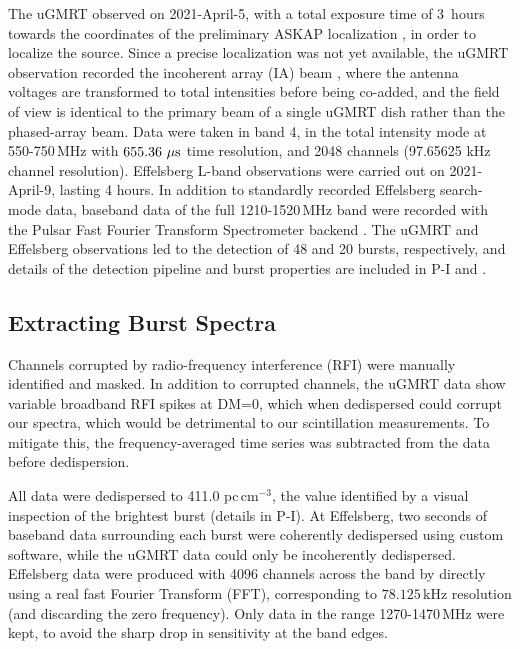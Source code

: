\documentclass[fleqn,usenatbib]{mnras}
\newcommand{\dmu}{pc\,cm$^{-3}$}
\begin{document}
The uGMRT observed on 2021-April-5, with a total exposure time of 3~hours towards the coordinates of the preliminary ASKAP localization \citep{askapAtelCoarse}, in order to localize the source.  Since a precise localization was not yet available, the uGMRT observation recorded the incoherent array (IA) beam \citep{uGMRTpaper}, where the antenna voltages are transformed to total intensities before being co-added, and the field of view is identical to the primary beam of a single uGMRT dish rather than the phased-array beam.
 Data were taken in band 4, in the total intensity mode at 550-750\,MHz with $655.36~{\rm \mu s}$ time resolution, and 2048 channels (97.65625 kHz channel resolution).  Effelsberg L-band observations were carried out on 2021-April-9, lasting 4 hours.  In addition to standardly recorded Effelsberg search-mode data, baseband data of the full 1210-1520\,MHz band were recorded with the Pulsar Fast Fourier Transform Spectrometer backend \citep{barr+13}.  The uGMRT and Effelsberg observations led to the detection of 48 and 20 bursts, respectively, and details of the detection pipeline and burst properties are included in P-I and \citet{hilmarsson_Eff}.


\subsection{Extracting Burst Spectra}
\label{sec:spectra}

Channels corrupted by radio-frequency interference (RFI) were manually identified and masked.  In addition to corrupted channels, the uGMRT data show variable broadband RFI spikes at DM=0,
which when dedispersed could corrupt our spectra, which would be detrimental to our scintillation measurements. To mitigate this, the frequency-averaged time series was subtracted from the data before dedispersion.

All data were dedispersed to 411.0 \dmu{}, the value identified by a visual inspection of the brightest burst (details in P-I).  At Effelsberg, two seconds of baseband data surrounding each burst were coherently dedispersed using custom software, while the uGMRT data could only be incoherently dedispersed.  Effelsberg data were produced with 4096 channels across the band by directly using a real fast Fourier Transform (FFT), corresponding to $78.125\,$kHz resolution (and discarding the zero frequency).  Only data in the range 1270-1470\,MHz were kept, to avoid the sharp drop in sensitivity at the band edges.
\end{document}
